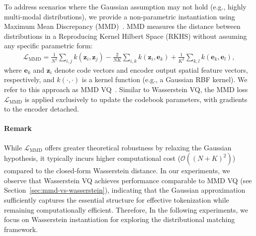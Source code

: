 To address scenarios where the Gaussian assumption may not hold (e.g., highly multi-modal distributions), we provide a non-parametric instantiation using Maximum Mean Discrepancy (MMD)~\cite{Gretton2012AKT, Sriperumbudur2009HilbertSE}. MMD measures the distance between distributions in a Reproducing Kernel Hilbert Space (RKHS) without assuming any specific parametric form:
\begin{align}
\mathcal{L}_{\text{MMD}} = \frac{1}{N^2}\sum_{i,j} k(\bm{z}_i, \bm{z}_j) - \frac{2}{NK}\sum_{i,k} k(\bm{z}_i, \bm{e}_k) + \frac{1}{K^2}\sum_{k,l} k(\bm{e}_k, \bm{e}_l),
\end{align}
where $\bm{e}_k$ and $\bm{z}_i$ denote code vectors and encoder output spatial feature vectors, respectively, and $k(\cdot, \cdot)$ is a kernel function (e.g., a Gaussian RBF kernel). We refer to this approach as MMD VQ~\cite{Fang2025VQTransplant}. Similar to Wasserstein VQ, the MMD loss $\mathcal{L}_{\text{MMD}}$ is applied exclusively to update the codebook parameters, with gradients to the encoder detached.

\paragraph{Remark} While $\mathcal{L}_{\text{MMD}}$ offers greater theoretical robustness by relaxing the Gaussian hypothesis, it typically incurs higher computational cost ($\mathcal{O}((N+K)^2)$) compared to the closed-form Wasserstein distance. In our experiments, we observe that Wasserstein VQ achieves performance comparable to MMD VQ (see Section~\ref{sec:mmd-vs-wasserstein}), indicating that the Gaussian approximation sufficiently captures the essential structure for effective tokenization while remaining computationally efficient. Therefore, In the following experiments, we focus on Wasserstein instantiation for exploring the distributional matching framework.


